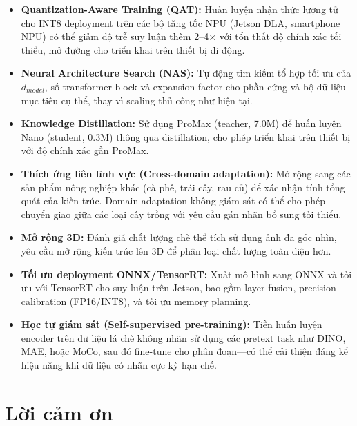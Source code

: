 \documentclass[conference]{IEEEtran}
\begin{document}
\begin{itemize}
    \item \textbf{Quantization-Aware Training (QAT):} Huấn luyện nhận thức lượng tử cho INT8 deployment trên các bộ tăng tốc NPU (Jetson DLA, smartphone NPU) có thể giảm độ trễ suy luận thêm 2--4$\times$ với tổn thất độ chính xác tối thiểu, mở đường cho triển khai trên thiết bị di động.

    \item \textbf{Neural Architecture Search (NAS):} Tự động tìm kiếm tổ hợp tối ưu của $d_{model}$, số transformer block và expansion factor cho phần cứng và bộ dữ liệu mục tiêu cụ thể, thay vì scaling thủ công như hiện tại.

    \item \textbf{Knowledge Distillation:} Sử dụng ProMax (teacher, 7.0M) để huấn luyện Nano (student, 0.3M) thông qua distillation, cho phép triển khai trên thiết bị với độ chính xác gần ProMax.

    \item \textbf{Thích ứng liên lĩnh vực (Cross-domain adaptation):} Mở rộng sang các sản phẩm nông nghiệp khác (cà phê, trái cây, rau củ) để xác nhận tính tổng quát của kiến trúc. Domain adaptation không giám sát có thể cho phép chuyển giao giữa các loại cây trồng với yêu cầu gán nhãn bổ sung tối thiểu.

    \item \textbf{Mở rộng 3D:} Đánh giá chất lượng chè thể tích sử dụng ảnh đa góc nhìn, yêu cầu mở rộng kiến trúc lên 3D để phân loại chất lượng toàn diện hơn.

    \item \textbf{Tối ưu deployment ONNX/TensorRT:} Xuất mô hình sang ONNX và tối ưu với TensorRT cho suy luận trên Jetson, bao gồm layer fusion, precision calibration (FP16/INT8), và tối ưu memory planning.

    \item \textbf{Học tự giám sát (Self-supervised pre-training):} Tiền huấn luyện encoder trên dữ liệu lá chè không nhãn sử dụng các pretext task như DINO, MAE, hoặc MoCo, sau đó fine-tune cho phân đoạn---có thể cải thiện đáng kể hiệu năng khi dữ liệu có nhãn cực kỳ hạn chế.
\end{itemize}


\section*{Lời cảm ơn}
\end{document}
